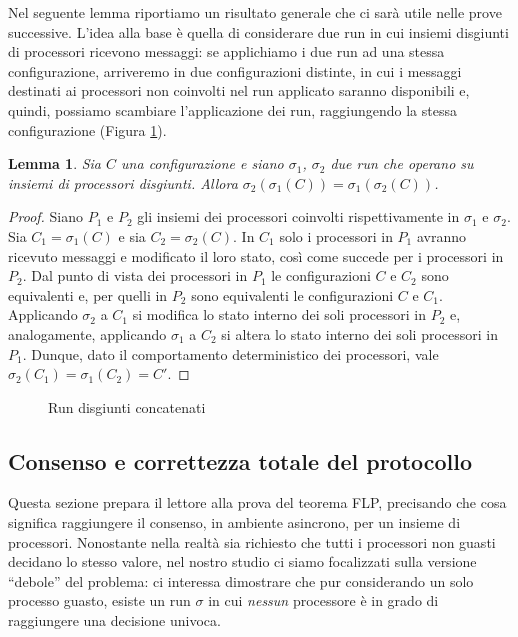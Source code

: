 \documentclass{article}
\newtheorem{lemma}{Lemma}
\begin{document}
Nel seguente lemma riportiamo un risultato generale che ci sar\`a
utile nelle prove successive. L'idea alla base \`e quella di
considerare due run in cui insiemi disgiunti di processori ricevono
messaggi: se applichiamo i due run ad una stessa configurazione,
arriveremo in due configurazioni distinte, in cui i messaggi destinati
ai processori non coinvolti nel run applicato saranno disponibili e,
quindi, possiamo scambiare l'applicazione dei run, raggiungendo la
stessa configurazione (Figura \ref{fig:concatenazioneSchedule}).

\begin{lemma}
  \label{lemma:eventsInterleaving}
  Sia $C$ una configurazione e siano $\sigma_1$, $\sigma_2$ due run
  che operano su insiemi di processori disgiunti. Allora
  $\sigma_2(\sigma_1(C))=\sigma_1(\sigma_2(C))$.
\end{lemma}

\begin{proof}
  Siano $P_1$ e $P_2$ gli insiemi dei processori coinvolti
  rispettivamente in $\sigma_1$ e $\sigma_2$. Sia $C_1=\sigma_1(C)$ e
  sia $C_2=\sigma_2(C)$. In $C_1$ solo i processori in $P_1$ avranno
  ricevuto messaggi e modificato il loro stato, così come succede per
  i processori in $P_2$. Dal punto di vista dei processori in $P_1$ le
  configurazioni $C$ e $C_2$ sono equivalenti e, per quelli in $P_2$
  sono equivalenti le configurazioni $C$ e $C_1$. Applicando
  $\sigma_2$ a $C_1$ si modifica lo stato interno dei soli processori
  in $P_2$ e, analogamente, applicando $\sigma_1$ a $C_2$ si altera lo
  stato interno dei soli processori in $P_1$. Dunque, dato il
  comportamento deterministico dei processori, vale
  $\sigma_2(C_1)=\sigma_1(C_2)=C'$.
\end{proof}

\begin{figure}[!h]
  \centering \caption{Run
    disgiunti concatenati}\label{fig:concatenazioneSchedule}
\end{figure}

\subsection{Consenso e correttezza totale del protocollo}

Questa sezione prepara il lettore alla prova del teorema FLP,
precisando che cosa significa raggiungere il consenso, in ambiente
asincrono, per un insieme di processori. Nonostante nella realt\`a sia
richiesto che tutti i processori non guasti decidano lo stesso valore,
nel nostro studio ci siamo focalizzati sulla versione ``debole'' del
problema: ci interessa dimostrare che pur considerando un solo
processo guasto, esiste un run $\sigma$ in cui \emph{nessun}
processore \`e in grado di raggiungere una decisione univoca.
\end{document}
